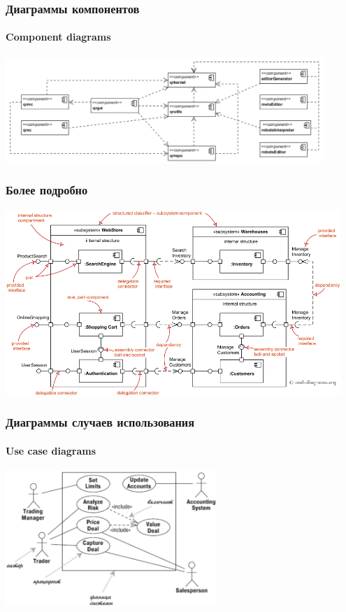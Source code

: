 \documentclass{../../slides-style}
\begin{document}
    \begin{frame}
        \frametitle{Диаграммы компонентов}
        \framesubtitle{Component diagrams}
        \begin{center}
            \includegraphics[width=0.9\textwidth]{componentDiagram.png}
        \end{center}
    \end{frame}

    \begin{frame}
        \frametitle{Более подробно}
        \begin{center}
            \includegraphics[width=0.95\textwidth]{componentDiagramsOverview.png}
        \end{center}
    \end{frame}

    \begin{frame}
        \frametitle{Диаграммы случаев использования}
        \framesubtitle{Use case diagrams}
        \begin{center}
            \includegraphics[width=0.6\textwidth]{useCaseDiagram.png}
        \end{center}
    \end{frame}
\end{document}
